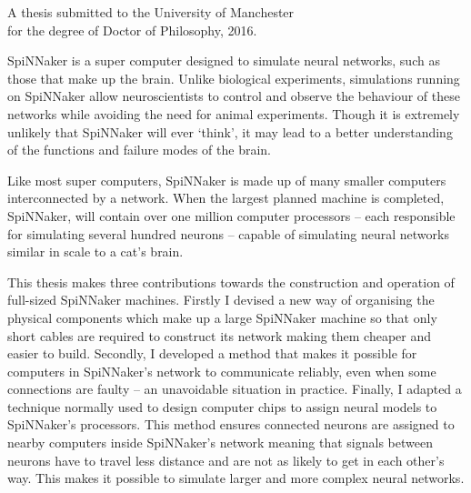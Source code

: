 {
	
	
	
	\vfill
	
	\begin{center}
		\textsc{\large\thesistitle}
		
		\vspace{0.5em}
		
		\thesisauthor
		
		\vspace{0.5em}
		
		A thesis submitted to the University of Manchester\\
		for the degree of Doctor of Philosophy, 2016.
	\end{center}
	
	\vfill
	
	
	SpiNNaker is a super computer designed to simulate neural networks, such as
	those that make up the brain. Unlike biological experiments, simulations
	running on SpiNNaker allow neuroscientists to control and observe the
	behaviour of these networks while avoiding the need for animal experiments.
	Though it is extremely unlikely that SpiNNaker will ever `think', it may lead
	to a better understanding of the functions and failure modes of the brain.
	
	Like most super computers, SpiNNaker is made up of many smaller computers
	interconnected by a network. When the largest planned machine is completed,
	SpiNNaker, will contain over one million computer processors -- each
	responsible for simulating several hundred neurons -- capable of simulating
	neural networks similar in scale to a cat's brain.
	
	This thesis makes three contributions towards the construction and operation
	of full-sized SpiNNaker machines. Firstly I devised a new way of organising
	the physical components which make up a large SpiNNaker machine so that only
	short cables are required to construct its network making them cheaper and
	easier to build. Secondly, I developed a method that makes it possible for
	computers in SpiNNaker's network to communicate reliably, even when some
	connections are faulty -- an unavoidable situation in practice.  Finally, I
	adapted a technique normally used to design computer chips to assign neural
	models to SpiNNaker's processors. This method ensures connected neurons are
	assigned to nearby computers inside SpiNNaker's network meaning that signals
	between neurons have to travel less distance and are not as likely to get in
	each other's way. This makes it possible to simulate larger and more complex
	neural networks.
	
	\par%
}
